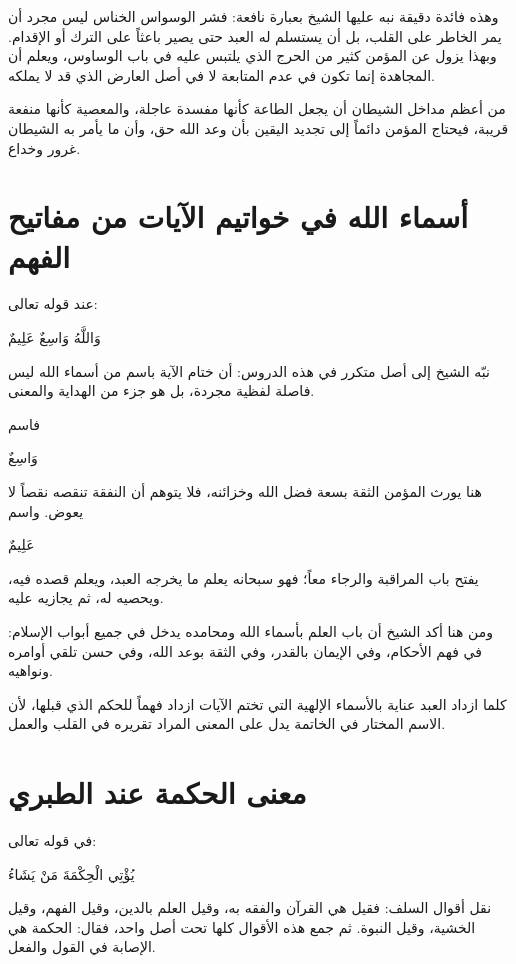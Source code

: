 وهذه فائدة دقيقة نبه عليها الشيخ بعبارة نافعة: فشر الوسواس الخناس ليس مجرد أن يمر الخاطر على القلب، بل أن يستسلم له العبد حتى يصير باعثاً على الترك أو الإقدام. وبهذا يزول عن المؤمن كثير من الحرج الذي يلتبس عليه في باب الوساوس، ويعلم أن المجاهدة إنما تكون في عدم المتابعة لا في أصل العارض الذي قد لا يملكه.

\begin{fawaid}
من أعظم مداخل الشيطان أن يجعل الطاعة كأنها مفسدة عاجلة، والمعصية كأنها منفعة قريبة، فيحتاج المؤمن دائماً إلى تجديد اليقين بأن وعد الله حق، وأن ما يأمر به الشيطان غرور وخداع.
\end{fawaid}

\section{أسماء الله في خواتيم الآيات من مفاتيح الفهم}
عند قوله تعالى: \begin{ayah}وَاللَّهُ وَاسِعٌ عَلِيمٌ\end{ayah} نبّه الشيخ إلى أصل متكرر في هذه الدروس: أن ختام الآية باسم من أسماء الله ليس فاصلة لفظية مجردة، بل هو جزء من الهداية والمعنى.

فاسم \begin{ayah}وَاسِعٌ\end{ayah} هنا يورث المؤمن الثقة بسعة فضل الله وخزائنه، فلا يتوهم أن النفقة تنقصه نقصاً لا يعوض. واسم \begin{ayah}عَلِيمٌ\end{ayah} يفتح باب المراقبة والرجاء معاً؛ فهو سبحانه يعلم ما يخرجه العبد، ويعلم قصده فيه، ويحصيه له، ثم يجازيه عليه.

ومن هنا أكد الشيخ أن باب العلم بأسماء الله ومحامده يدخل في جميع أبواب الإسلام: في فهم الأحكام، وفي الإيمان بالقدر، وفي الثقة بوعد الله، وفي حسن تلقي أوامره ونواهيه.

\begin{fawaid}
كلما ازداد العبد عناية بالأسماء الإلهية التي تختم الآيات ازداد فهماً للحكم الذي قبلها، لأن الاسم المختار في الخاتمة يدل على المعنى المراد تقريره في القلب والعمل.
\end{fawaid}

\section{معنى الحكمة عند الطبري}
في قوله تعالى: \begin{ayah}يُؤْتِي الْحِكْمَةَ مَنْ يَشَاءُ\end{ayah} نقل  أقوال السلف: فقيل هي القرآن والفقه به، وقيل العلم بالدين، وقيل الفهم، وقيل الخشية، وقيل النبوة. ثم جمع هذه الأقوال كلها تحت أصل واحد، فقال: الحكمة هي الإصابة في القول والفعل.

